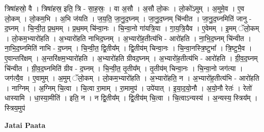 \documentclass[17pt]{extarticle}
\begin{document}
त्रिषा॑हस्रो॒ वै । त्रिषा॑हस्र॒ इति॒ त्रि - सा॒ह॒स्रः॒ । वा अ॒सौ । अ॒सौ लो॒कः । लो॒को॑ऽमुम् । अ॒मुमे॒व । ए॒व लो॒कम् । लो॒कम॒भि । अ॒भि ज॑यति । ज॒य॒ति॒ जा॒नु॒द॒घ्नम् । जा॒नु॒द॒घ्नम् चि॑न्वीत । जा॒नु॒द॒घ्नमिति॑ जानु - द॒घ्नम् । चि॒न्वी॒त॒ प्र॒थ॒मम् । प्र॒थ॒मम् चि॑न्वा॒नः । चि॒न्वा॒नो गा॑यत्रि॒या । गा॒य॒त्रि॒यैव । ए॒वेमम् । इ॒मम् ॅलो॒कम् । लो॒कम॒भ्यारो॑हति । अ॒भ्यारो॑हति नाभिद॒घ्नम् । अ॒भ्यारो॑ह॒तीत्य॑भि - आरो॑हति । ना॒भि॒द॒घ्नम् चि॑न्वीत । ना॒भि॒द॒घ्नमिति॑ नाभि - द॒घ्नम् । चि॒न्वी॒त॒ द्वि॒तीय᳚म् । द्वि॒तीय॑म् चिन्वा॒नः । चि॒न्वा॒नस्त्रि॒ष्टुभा᳚ । त्रि॒ष्टुभै॒व । ए॒वान्तरि॑क्षम् । अ॒न्तरि॑क्षम॒भ्यारो॑हति । अ॒भ्यारो॑हति ग्रीवद॒घ्नम् । अ॒भ्यारो॑ह॒तीत्य॑भि - आरो॑हति । ग्री॒व॒द॒घ्नम् चि॑न्वीत । ग्री॒व॒द॒घ्नमिति॑ ग्रीव - द॒घ्नम् । चि॒न्वी॒त॒ तृ॒तीय᳚म् । तृ॒तीय॑म् चिन्वा॒नः । चि॒न्वा॒नो जग॑त्या । जग॑त्यै॒व । ए॒वामुम् । अ॒मुम् ॅलो॒कम् । लो॒कम॒भ्यारो॑हति । अ॒भ्यारो॑हति॒ न । अ॒भ्यारो॑ह॒तीत्य॑भि - आरो॑हति । नाग्निम् । अ॒ग्निम् चि॒त्वा । चि॒त्वा रा॒माम् । रा॒मामुप॑ । उपे॑यात् । इ॒या॒द॒यो॒नौ । अ॒यो॒नौ रेतः॑ । रेतो॑ धास्यामि । धा॒स्या॒मीति॑ । इति॒ न । न द्वि॒तीय᳚म् । द्वि॒तीय॑म् चि॒त्वा । चि॒त्वाऽन्यस्य॑ । अ॒न्यस्य॒ स्त्रिय᳚म् । स्त्रिय॒मुप॑ \newline

\textbf{Jatai Paata} \newline
\end{document}
